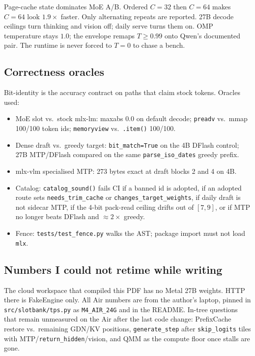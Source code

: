 Page-cache state dominates MoE A/B. Ordered $C{=}32$ then $C{=}64$ makes $C{=}64$ look $1.9\times$ faster. Only alternating repeats are reported. 27B decode ceilings turn thinking and vision off; daily serve turns them on. OMP temperature stays $1.0$; the envelope remaps $T\ge 0.99$ onto Qwen's documented pair. The runtime is never forced to $T{=}0$ to chase a bench.

\subsection{Correctness oracles}

Bit-identity is the accuracy contract on paths that claim stock tokens. Oracles used:

\begin{itemize}[leftmargin=1.4em]
\item MoE slot vs.\ stock mlx-lm: maxabs $0.0$ on default decode; \texttt{preadv} vs.\ mmap 100/100 token ids; \texttt{memoryview} vs.\ \texttt{.item()} 100/100.
\item Dense draft vs.\ greedy target: \texttt{bit\_match=True} on the 4B DFlash control; 27B MTP/DFlash compared on the same \texttt{parse\_iso\_dates} greedy prefix.
\item mlx-vlm specialised MTP: 273 bytes exact at draft blocks 2 and 4 on 4B.
\item Catalog: \texttt{catalog\_sound()} fails CI if a banned id is adopted, if an adopted route sets \texttt{needs\_trim\_cache} or \texttt{changes\_target\_weights}, if daily draft is not sidecar MTP, if the 4-bit pack-read ceiling drifts out of $[7,9]$, or if MTP no longer beats DFlash and $\approx 2\times$ greedy.
\item Fence: \texttt{tests/test\_fence.py} walks the AST; package import must not load \texttt{mlx}.
\end{itemize}

\subsection{Numbers I could not retime while writing}

The cloud workspace that compiled this PDF has no Metal 27B weights. HTTP there is FakeEngine only. All Air numbers are from the author's laptop, pinned in \texttt{src/slotbank/tps.py} as \texttt{M4\_AIR\_24G} and in the README. In-tree questions that remain unmeasured on the Air after the last code change: PrefixCache restore vs.\ remaining GDN/KV positions, \texttt{generate\_step} after \texttt{skip\_logits} tiles with MTP/\texttt{return\_hidden}/vision, and QMM as the compute floor once stalls are gone.

